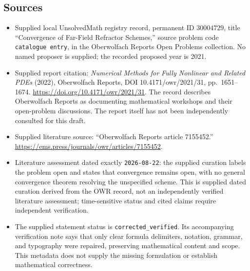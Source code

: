\documentclass[11pt]{article}
\begin{document}
\subsection{Sources}
\begin{itemize}
\item Supplied local UnsolvedMath registry record, permanent ID \(30004729\), title ``Convergence of Far-Field Refractor Schemes,'' source problem code \texttt{catalogue entry}, in the Oberwolfach Reports Open Problems collection. No named proposer is supplied; the recorded proposed year is 2021.
\item Supplied report citation: \emph{Numerical Methods for Fully Nonlinear and Related PDEs} (2022), Oberwolfach Reports, DOI 10.4171/owr/2021/31, pp.\ 1651--1674. \url{https://doi.org/10.4171/owr/2021/31}. The record describes Oberwolfach Reports as documenting mathematical workshops and their open-problem discussions. The report itself has not been independently consulted for this draft.
\item Supplied literature source: ``Oberwolfach Reports article 7155452.'' \url{https://ems.press/journals/owr/articles/7155452}.
\item Literature assessment dated exactly \texttt{2026-08-22}: the supplied curation labels the problem open and states that convergence remains open, with no general convergence theorem resolving the unspecified scheme. This is supplied dated curation derived from the OWR record, not an independently verified literature assessment; time-sensitive status and cited claims require independent verification.
\item The supplied statement status is \texttt{corrected\_verified}. Its accompanying verification note says that only clear formula delimiters, notation, grammar, and typography were repaired, preserving mathematical content and scope. This metadata does not supply the missing formulation or establish mathematical correctness.
\end{itemize}
\end{document}

